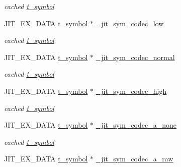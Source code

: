 \begin{DoxyCompactItemize}
\begin{DoxyCompactList}\small\item\em cached \hyperlink{structt__symbol}{t\_\-symbol} \item\end{DoxyCompactList}\item 
\hypertarget{group__jitter_ga09b7e8c39e5b87da3cefcd995acf375f}{
JIT\_\-EX\_\-DATA \hyperlink{structt__symbol}{t\_\-symbol} $\ast$ \hyperlink{group__jitter_ga09b7e8c39e5b87da3cefcd995acf375f}{\_\-jit\_\-sym\_\-codec\_\-low}}
\label{group__jitter_ga09b7e8c39e5b87da3cefcd995acf375f}

\begin{DoxyCompactList}\small\item\em cached \hyperlink{structt__symbol}{t\_\-symbol} \item\end{DoxyCompactList}\item 
\hypertarget{group__jitter_ga346c1416411acf9cccd2df39d9db377e}{
JIT\_\-EX\_\-DATA \hyperlink{structt__symbol}{t\_\-symbol} $\ast$ \hyperlink{group__jitter_ga346c1416411acf9cccd2df39d9db377e}{\_\-jit\_\-sym\_\-codec\_\-normal}}
\label{group__jitter_ga346c1416411acf9cccd2df39d9db377e}

\begin{DoxyCompactList}\small\item\em cached \hyperlink{structt__symbol}{t\_\-symbol} \item\end{DoxyCompactList}\item 
\hypertarget{group__jitter_ga81846a335caf21d8cb9680a36dc03881}{
JIT\_\-EX\_\-DATA \hyperlink{structt__symbol}{t\_\-symbol} $\ast$ \hyperlink{group__jitter_ga81846a335caf21d8cb9680a36dc03881}{\_\-jit\_\-sym\_\-codec\_\-high}}
\label{group__jitter_ga81846a335caf21d8cb9680a36dc03881}

\begin{DoxyCompactList}\small\item\em cached \hyperlink{structt__symbol}{t\_\-symbol} \item\end{DoxyCompactList}\item 
\hypertarget{group__jitter_gafa0cfef7ddabddd7f18f73e1154e3c1c}{
JIT\_\-EX\_\-DATA \hyperlink{structt__symbol}{t\_\-symbol} $\ast$ \hyperlink{group__jitter_gafa0cfef7ddabddd7f18f73e1154e3c1c}{\_\-jit\_\-sym\_\-codec\_\-a\_\-none}}
\label{group__jitter_gafa0cfef7ddabddd7f18f73e1154e3c1c}

\begin{DoxyCompactList}\small\item\em cached \hyperlink{structt__symbol}{t\_\-symbol} \item\end{DoxyCompactList}\item 
\hypertarget{group__jitter_gae5960549d24f8f8fb23720ae53a76edb}{
JIT\_\-EX\_\-DATA \hyperlink{structt__symbol}{t\_\-symbol} $\ast$ \hyperlink{group__jitter_gae5960549d24f8f8fb23720ae53a76edb}{\_\-jit\_\-sym\_\-codec\_\-a\_\-raw}}
\label{group__jitter_gae5960549d24f8f8fb23720ae53a76edb}


\end{DoxyCompactItemize}
